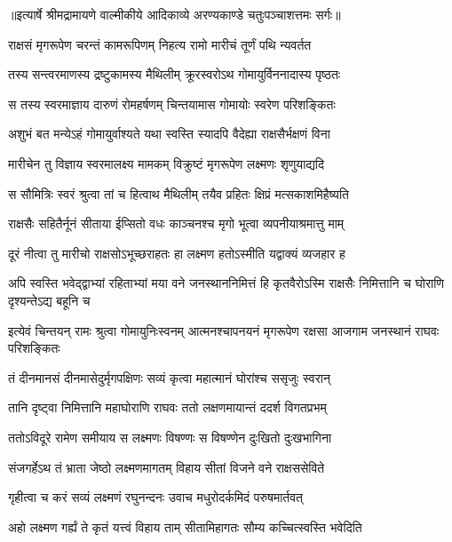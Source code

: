 {॥इत्यार्षे श्रीमद्रामायणे वाल्मीकीये आदिकाव्ये अरण्यकाण्डे चतुःपञ्चाशत्तमः सर्गः॥}


\twolineshloka
{राक्षसं मृगरूपेण चरन्तं कामरूपिणम्}
{निहत्य रामो मारीचं तूर्णं पथि न्यवर्तत} %

\twolineshloka
{तस्य सन्त्वरमाणस्य द्रष्टुकामस्य मैथिलीम्}
{क्रूरस्वरोऽथ गोमायुर्विननादास्य पृष्ठतः} %

\twolineshloka
{स तस्य स्वरमाज्ञाय दारुणं रोमहर्षणम्}
{चिन्तयामास गोमायोः स्वरेण परिशङ्कितः} %

\twolineshloka
{अशुभं बत मन्येऽहं गोमायुर्वाश्यते यथा}
{स्वस्ति स्यादपि वैदेह्या राक्षसैर्भक्षणं विना} %

\twolineshloka
{मारीचेन तु विज्ञाय स्वरमालक्ष्य मामकम्}
{विक्रुष्टं मृगरूपेण लक्ष्मणः शृणुयाद्यदि} %

\twolineshloka
{स सौमित्रिः स्वरं श्रुत्वा तां च हित्वाथ मैथिलीम्}
{तयैव प्रहितः क्षिप्रं मत्सकाशमिहैष्यति} %

\twolineshloka
{राक्षसैः सहितैर्नूनं सीताया ईप्सितो वधः}
{काञ्चनश्च मृगो भूत्वा व्यपनीयाश्रमात्तु माम्} %

\twolineshloka
{दूरं नीत्वा तु मारीचो राक्षसोऽभूच्छराहतः}
{हा लक्ष्मण हतोऽस्मीति यद्वाक्यं व्यजहार ह} %

\threelineshloka
{अपि स्वस्ति भवेद्द्वाभ्यां रहिताभ्यां मया वने}
{जनस्थाननिमित्तं हि कृतवैरोऽस्मि राक्षसैः}
{निमित्तानि च घोराणि दृश्यन्तेऽद्य बहूनि च} %

\threelineshloka
{इत्येवं चिन्तयन् रामः श्रुत्वा गोमायुनिःस्वनम्}
{आत्मनश्चापनयनं मृगरूपेण रक्षसा}
{आजगाम जनस्थानं राघवः परिशङ्कितः} %

\twolineshloka
{तं दीनमानसं दीनमासेदुर्मृगपक्षिणः}
{सव्यं कृत्वा महात्मानं घोरांश्च ससृजुः स्वरान्} %

\twolineshloka
{तानि दृष्ट्वा निमित्तानि महाघोराणि राघवः}
{ततो लक्षणमायान्तं ददर्श विगतप्रभम्} %

\twolineshloka
{ततोऽविदूरे रामेण समीयाय स लक्ष्मणः}
{विषण्णः स विषण्णेन दुःखितो दुःखभागिना} %

\twolineshloka
{संजगर्हेऽथ तं भ्राता जेष्ठो लक्ष्मणमागतम्}
{विहाय सीतां विजने वने राक्षससेविते} %

\twolineshloka
{गृहीत्वा च करं सव्यं लक्ष्मणं रघुनन्दनः}
{उवाच मधुरोदर्कमिदं परुषमार्तवत्} %

\twolineshloka
{अहो लक्ष्मण गर्ह्यं ते कृतं यत्त्वं विहाय ताम्}
{सीतामिहागतः सौम्य कच्चित्स्वस्ति भवेदिति} %

